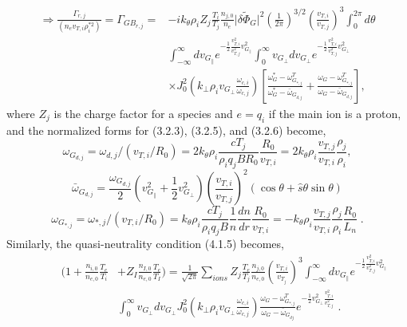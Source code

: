 \documentclass[12pt]{article}
\numberwithin{equation}{subsection}
\begin{document}
   \begin{equation}
   \begin{aligned}
      \Rightarrow    \frac{\Gamma_{r,j}}{(n_ev_{T,i}\rho_i^{*2})} = \Gamma_{GB_{r,j}} =
                    &-ik_\theta\rho_iZ_j\frac{T_i}{T_j}\frac{n_{j,0}}{n_e}\lvert\delta\widetilde{\Phi}_G\rvert^2
                     \left(\frac{1}{2\pi}\right)^{3/2}\left(\frac{v_{T,i}}{v_{T,j}}\right)^3\int_{0}^{2\pi}d\theta \\
                    &\int_{-\infty}^{\infty}dv_{G_\parallel}e^{-\frac{1}{2}\frac{v_{T,i}^2}{v_{T,j}^2}{v_{G_\parallel}^2}}
                     \int_{0}^{\infty}v_{G_\perp}dv_{G_\perp}e^{-\frac{1}{2}\frac{v_{T,i}^2}{v_{T,j}^2}v_{G_\perp}^2} \\
                    &\times J_0^2(k_\perp\rho_iv_{G_\perp}\frac{\omega_{c,i}}{\omega_{c,j}})
                     [\frac{\omega_G^*-\omega^T_{G_{*,j}}}{\omega_G^*-\bar{\omega}_{G_{d,j}}}
                     + \frac{\omega_G-\omega^T_{G_{*,j}}}{\omega_G-\bar{\omega}_{G_{d,j}}}],
   \end{aligned}
   \end{equation}
where $Z_j$ is the charge factor for a species and $e=q_i$ if the main ion is a proton, and the normalized forms for (3.2.3), (3.2.5), and (3.2.6) become,
   \begin{equation}
      \omega_{G_{d,j}} = \omega_{d,j}/(v_{T,i}/R_0) = 2k_\theta\rho_i\frac{cT_j}{\rho_iq_jBR_0}\frac{R_0}{v_{T,i}} =
                         2k_\theta\rho_i\frac{v_{T,j}}{v_{T,i}}\frac{\rho_j}{\rho_i},
   \end{equation}
   \begin{equation}
      \bar{\omega}_{G_{d,j}} = \frac{\omega_{G_{d,j}}}{2}(v_{G_\parallel}^2 + \frac{1}{2}v_{G_\perp}^2)
                               \left(\frac{v_{T,i}}{v_{T,j}}\right)^2(\cos\theta + \hat{s}\theta\sin\theta)
   \end{equation}
   \begin{equation}
      \omega_{G_{*,j}} = \omega_{*,j}/(v_{T,i}/R_0) = k_\theta\rho_i\frac{cT_j}{\rho_iq_jB}\frac{1}{n}\frac{dn}{dr}\frac{R_0}{v_{T,i}}
                       = -k_\theta\rho_i\frac{v_{T,j}}{v_{T,i}}\frac{\rho_j}{\rho_i}\frac{R_0}{L_n}\;.
   \end{equation}
Similarly, the quasi-neutrality condition (4.1.5) becomes,
   \begin{equation}
   \begin{aligned}
       \quad\quad\quad(1 + \frac{n_{i,0}}{n_{e,0}}\frac{T_e}{T_i} 
      &+ Z_I\frac{n_{I,0}}{n_{e,0}}\frac{T_e}{T_I}) =
       \frac{1}{\sqrt{2\pi}}\sum\limits_{ions}Z_j\frac{T_e}{T_j}\frac{n_{j,0}}{n_{e,0}}\left(\frac{v_{T,i}}{v_{T_j}}\right)^{3}
       \int_{-\infty}^{\infty}dv_{G_\parallel}e^{-\frac{1}{2}\frac{v^2_{T,i}}{v^2_{T,j}}v_{G_\parallel}^2} \\
      &\int_{0}^{\infty}v_{G_\perp} dv_{G_\perp} J_0^2(k_\perp\rho_i v_{G_\perp}\frac{\omega_{c,i}}{\omega_{c,j}})
       \frac{\omega_G - \omega_{G_{*,j}}^T}{\omega_G - \bar{\omega}_{G_{dj}}}e^{-\frac{1}{2}v_{G_\perp}^2\frac{v_{T,i}^2}{v_{T,j}^2}}\;.
   \end{aligned}
   \end{equation}
\end{document}
